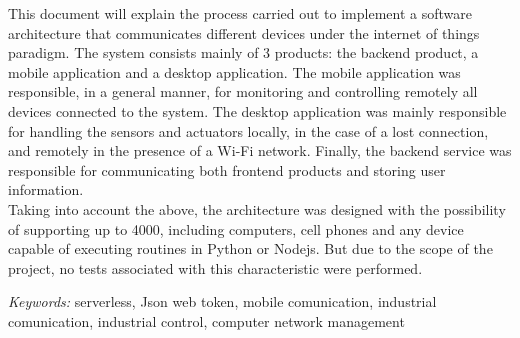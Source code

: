 This document will explain the process carried out to implement a software architecture that communicates different devices under the internet of things paradigm. The system consists mainly of 3 products: the backend product, a mobile application and a desktop application. The mobile application was responsible, in a general manner, for monitoring and controlling remotely all devices connected to the system. The desktop application was mainly responsible for handling the sensors and actuators locally, in the case of a lost connection, and remotely in the presence of a Wi-Fi network. Finally, the backend service was responsible for communicating both frontend products and storing user information.
\vspace{0.5cm}\\
Taking into account the above, the architecture was designed with the possibility of supporting up to 4000, including computers, cell phones and any device capable of executing routines in Python or Nodejs. But due to the scope of the project, no tests associated with this characteristic were performed.

\begin{center}
\textsl{Keywords:} serverless, Json web token, mobile comunication, industrial comunication, industrial control, computer network management
\end{center}